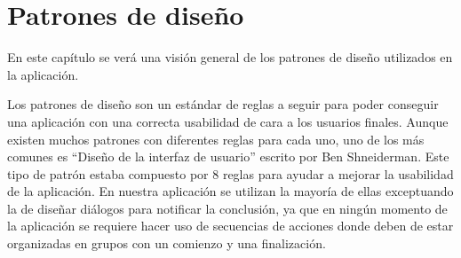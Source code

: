 \chapter{Patrones de diseño}
\label{cap:patronesDeDiseño}



\begin{resumen}
	En este capítulo se verá una visión general de los patrones de diseño utilizados en la aplicación.
\end{resumen}


Los patrones de diseño son un estándar de reglas a seguir para poder conseguir una aplicación con una correcta usabilidad de cara a los usuarios finales. Aunque existen muchos patrones con diferentes reglas para cada uno, uno de los más comunes es “Diseño de la interfaz de usuario” escrito por Ben Shneiderman. Este tipo de patrón estaba compuesto por 8 reglas para ayudar a mejorar la usabilidad de la aplicación.
En nuestra aplicación se utilizan la mayoría de ellas exceptuando la de diseñar diálogos para notificar la conclusión, ya que en ningún momento de la aplicación se requiere hacer uso de secuencias de acciones donde deben de estar organizadas en grupos con un comienzo y una finalización.



